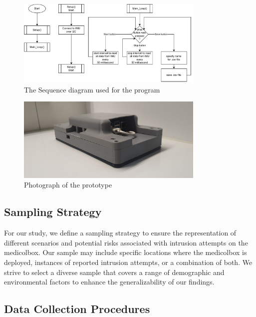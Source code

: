 \documentclass[../main.tex]{subfiles}
\begin{document}
    \begin{figure}[htbp]
        \centering
        \includegraphics[width=0.8\textwidth]
        {resources/figures/sequence.drawio.pdf}
        \caption{The Sequence diagram used for the program}
        \label{fig:sequence_diagram}
    \end{figure}
    
    \begin{figure}[htbp]
        \centering
        \includegraphics[width=0.8\textwidth]
        {resources/images/prototype_image.jpg}
        \caption{Photograph of the prototype}
        \label{fig:prototype_image}
    \end{figure}

    \subsection{Sampling Strategy}

    For our study, we define a sampling strategy to ensure the
    representation of different scenarios and potential risks associated with
    \gls{intrusion} attempts on the \gls{medicolbox}.
    Our sample may include specific locations where the \gls{medicolbox} is deployed,
    instances of reported \gls{intrusion} attempts,
    or a combination of both. We strive to select a diverse sample that covers a range of
    demographic and environmental factors to enhance the generalizability of our findings.

    \subsection{Data Collection Procedures}
\end{document}
